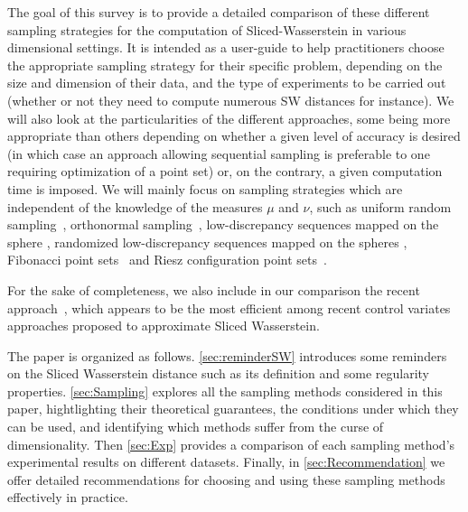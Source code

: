The goal of this survey is to provide a detailed comparison of these different sampling strategies for the computation of Sliced-Wasserstein in various dimensional settings. It is intended as a user-guide to help practitioners choose the appropriate sampling strategy for their specific problem, depending on the size and dimension of their data, and the type of experiments to be carried out (whether or not they need to compute numerous SW distances for instance). We will also look at the particularities of the different approaches, some being more appropriate than others depending on whether a given level of accuracy is desired (in which case an approach allowing sequential sampling is preferable to one requiring optimization of a point set) or, on the contrary, a given computation time is imposed.  
We will mainly focus on sampling strategies which are independent of the knowledge of the measures $\mu$ and $\nu$, such as uniform random sampling~\citep{asmussen2007stochastic},
 orthonormal sampling~\citep{rowland2019orthogonal}, low-discrepancy sequences mapped on the sphere \citep{halton1964algorithm,sobol1967distribution}, randomized low-discrepancy sequences mapped on the spheres \citep{owen2019monte}, Fibonacci point sets~\citep{hardin2016comparison} and Riesz configuration point sets~\citep{GOTZ200362}.

For the sake of completeness, we  also include in our comparison the recent  approach~\citep{leluc2024slicedwassersteinestimationsphericalharmonics}, which appears to be the most efficient among recent control variates approaches proposed to approximate Sliced Wasserstein.   


The paper is organized as follows. \autoref{sec:reminderSW} introduces some reminders on the 
Sliced Wasserstein distance such as its definition and some regularity 
properties. \autoref{sec:Sampling} explores all the sampling methods considered 
in this paper, hightlighting their theoretical guarantees, the conditions under 
which they can be used, and identifying which methods suffer from the curse of 
dimensionality. Then \autoref{sec:Exp} provides a comparison of each sampling 
method's experimental results on different datasets. Finally, in 
\autoref{sec:Recommendation} we offer detailed recommendations for choosing and 
using these 
{sampling}
methods effectively in practice.
